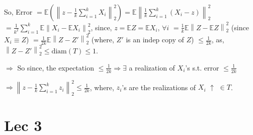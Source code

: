 \documentclass[12pt]{article}
\begin{document}
So, Error $=\mathbb{E}\left(\left\|z - \frac{1}{k} \sum_{i=1}^k X_i\right\|_2^2\right) = \mathbb{E}\left\|\frac{1}{k} \sum_{i=1}^k (X_i - z)\right\|_2^2$
$= \frac{1}{k^2} \sum_{i=1}^k \mathbb{E}\left\|X_i - \mathbb{E}X_i\right\|_2^2$, since, $z = \mathbb{E}Z = \mathbb{E}X_i$, $\forall i$
$= \frac{1}{k} \mathbb{E}\left\|Z - \mathbb{E}Z\right\|_2^2$ (since $X_i \equiv Z$)
$= \frac{1}{2k} \mathbb{E}\left\|Z - Z'\right\|_2^2$ (where, $Z'$ is an indep copy of $Z$)
$\leq \frac{1}{2k}$, as, $\left\|Z-Z'\right\|_2^2 \leq \text{diam}(T) \leq 1$.

$\Rightarrow$ So since, the expectation $\leq \frac{1}{2k} \Rightarrow \exists$ a realization of $X_i$'s s.t. error $\leq \frac{1}{2k}$

$\Rightarrow \left\|z - \frac{1}{k} \sum_{i=1}^k z_i\right\|_2^2 \leq \frac{1}{2k}$, where, $z_i$'s are the realizations of $X_i$
$\uparrow$
$\in T$.


\section*{Lec 3}
\end{document}
